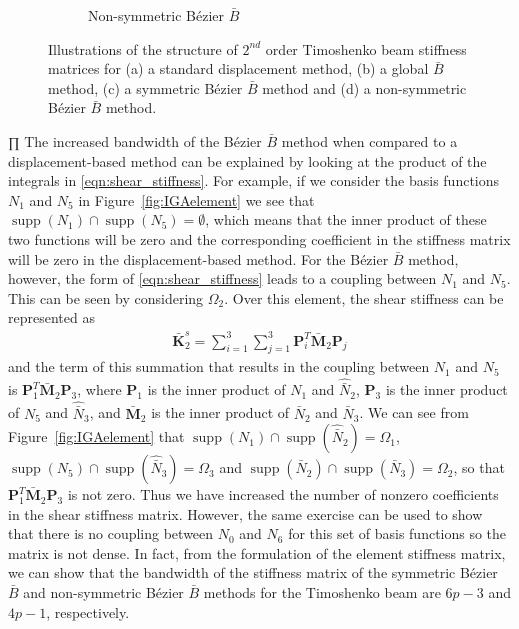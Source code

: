 \documentclass{article}
\begin{document}
\begin{figure}[!htb]
\begin{subfigure}[b]{0.24\linewidth}
        \caption{Non-symmetric B\'ezier $\bar{B}$}
    \end{subfigure}
    \caption{Illustrations of the structure of $2^{nd}$ order Timoshenko beam stiffness matrices for (a) a standard displacement method, (b) a global $\bar{B}$ method, (c) a symmetric B\'ezier $\bar{B}$ method and (d) a non-symmetric B\'ezier $\bar{B}$ method.}
    \label{fig:stiffness_matrix}
\end{figure}
∏
The increased bandwidth of the  B\'ezier $\bar{B}$ method when compared to a displacement-based method can be explained by looking at the product of the integrals in \eqref{eqn:shear_stiffness}. For example, if we consider the basis functions $N_{1}$ and $N_{5}$ in Figure~\ref{fig:IGAelement} we see that $\operatorname{supp}(N_{1}) \cap{} \operatorname{supp}(N_{5}) = \emptyset$, which means that the inner product of these two functions will be zero and the corresponding coefficient in the stiffness matrix will be zero in the displacement-based method. For the B\'ezier $\bar{B}$ method, however, the form of \eqref{eqn:shear_stiffness} leads to a coupling between $N_{1}$ and $N_{5}$. This can be seen by considering $\Omega_2$. Over this element, the shear stiffness can be represented as
\begin{align}
	\bar{\mathbf{K}}^s_2 = \sum_{i=1}^3 \sum_{j=1}^3 \mathbf{P}_i^T\bar{\mathbf{M}}_2\mathbf{P}_j
\end{align}
and the term of this summation that results in the coupling between $N_{1}$ and $N_{5}$ is $\mathbf{P}_1^T\bar{\mathbf{M}}_2\mathbf{P}_3$, where $\mathbf{P}_1$ is the inner product of $N_{1}$ and $\hat{\bar{N}}_{2}$, $\mathbf{P}_3$ is the inner product of $N_{5}$ and $\hat{\bar{N}}_{3}$, and $\bar{\mathbf{M}}_2$ is the inner product of $\bar{N}_{2}$ and $\bar{N}_{3}$. We can see from Figure~\ref{fig:IGAelement} that $\operatorname{supp}(N_{1})\cap{}\operatorname{supp}(\hat{\bar{N}}_{2})=\Omega_1$, $\operatorname{supp}(N_{5})\cap{}\operatorname{supp}(\hat{\bar{N}}_{3})=\Omega_3$ and $\operatorname{supp}(\bar{N}_{2})\cap{}\operatorname{supp}(\bar{N}_{3})=\Omega_2$, so that $\mathbf{P}_1^T\bar{\mathbf{M}}_2\mathbf{P}_3$ is not zero. Thus we have increased the number of nonzero coefficients in the shear stiffness matrix. However, the same exercise can be used to show that there is no coupling between $N_{0}$ and $N_{6}$ for this set of basis functions so the matrix is not dense.  In fact, from the formulation of the element stiffness matrix, we can show that the bandwidth of the stiffness matrix of the symmetric B\'ezier $\bar{B}$ and non-symmetric B\'ezier $\bar{B}$ methods for the Timoshenko beam are $6p-3$ and $4p-1$, respectively. 
\end{document}
